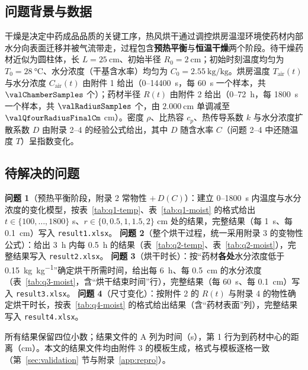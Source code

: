 \subsection{问题背景与数据}
干燥是决定中药成品品质的关键工序，热风烘干通过调控烘房温湿环境使药材内部水分向表面迁移并被气流带走，过程包含\textbf{预热平衡}与\textbf{恒温干燥}两个阶段。待干燥药材近似为圆柱体，长 $L=\SI{25}{\centi\meter}$、初始半径 $R_0=\SI{2}{\centi\meter}$；初始时刻温度均匀为 $T_0=\SI{28}{\celsius}$、水分浓度（干基含水率）均匀为 $C_0=\SI{2.55}{\kilo\gram\per\kilo\gram}$。烘房温度 $T_{\mathrm{air}}(t)$ 与水分浓度 $C_{\mathrm{air}}(t)$ 由附件 1 给出（$0$--\SI{14400}{\second}，每 \SI{60}{\second} 一个样本，共 $\valChamberSamples$ 个）；药材半径 $R(t)$ 由附件 2 给出（$0$--\SI{72}{\hour}，每 \SI{1800}{\second} 一个样本，共 $\valRadiusSamples$ 个，由 $\SI{2.000}{\centi\meter}$ 单调减至 $\valQfourRadiusFinalCm$ \si{\centi\meter}）。密度 $\rho$、比热容 $c_p$、热传导系数 $k$ 与水分浓度扩散系数 $D$ 由附录 2--4 的经验公式给出，其中 $D$ 随含水率 $C$（问题 2--4 中还随温度 $T$）呈指数变化。

\subsection{待解决的问题}
\textbf{问题 1}（预热平衡阶段，附录 2 常物性 $+\,D(C)$）：建立 $0$--\SI{1800}{\second} 内温度与水分浓度的变化模型，按表~\ref{tab:q1-temp}、表~\ref{tab:q1-moist} 的格式给出 $t\in\{100,\dots,1800\}$ \si{\second}、$r\in\{0,0.5,1,1.5,2\}$ \si{\centi\meter} 处的结果，完整结果（每 \SI{1}{\second}、每 \SI{0.1}{\centi\meter}）写入 \nolinkurl{result1.xlsx}。
\textbf{问题 2}（整个烘干过程，统一采用附录 3 的变物性公式）：给出 \SI{3}{\hour} 内每 \SI{0.5}{\hour} 的结果（表~\ref{tab:q2-temp}、表~\ref{tab:q2-moist}），完整结果写入 \nolinkurl{result2.xlsx}。
\textbf{问题 3}（烘干时长）：按“药材\textbf{各处}水分浓度低于 \SI{0.15}{\kilo\gram\per\kilo\gram}”确定烘干所需时间，给出每 \SI{6}{\hour}、每 \SI{0.5}{\centi\meter} 的水分浓度（表~\ref{tab:q3-moist}，含“烘干结束时间”行），完整结果（每 \SI{60}{\second}、每 \SI{0.1}{\centi\meter}）写入 \nolinkurl{result3.xlsx}。
\textbf{问题 4}（尺寸变化）：按附件 2 的 $R(t)$ 与附录 4 的物性确定烘干时长，按表~\ref{tab:q4-moist} 的格式给出结果（含“药材表面”列），完整结果写入 \nolinkurl{result4.xlsx}。

所有结果保留四位小数；结果文件的 A 列为时间（\si{\second}），第 1 行为到药材中心的距离（\si{\centi\meter}）。本文的结果文件均由附件 3 的模板生成，格式与模板逐格一致（第~\ref{sec:validation} 节与附录~\ref{app:repro}）。

